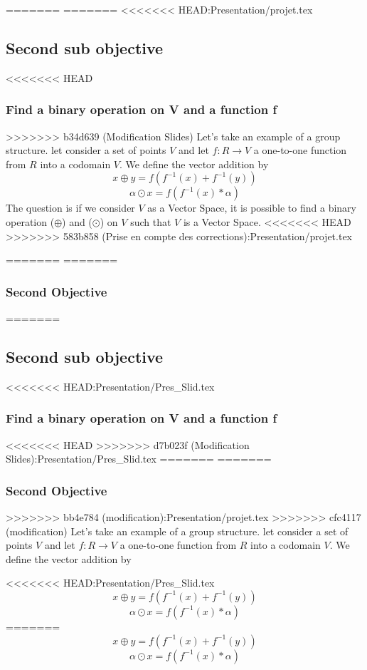 \documentclass{beamer}
\begin{document}
\begin{frame}
\begin{frame}
\begin{frame}
\begin{frame}
\begin{frame}
\begin{frame}
=======
=======
<<<<<<< HEAD:Presentation/projet.tex
\subsection{Second sub objective}
\begin{frame}
<<<<<<< HEAD
    \frametitle{Find a binary operation on V and a function f }
>>>>>>> b34d639 (Modification Slides)
    Let's take an example of a group structure.
    let consider a set of points  $ V $ and let  $ f: R \rightarrow V $ a one-to-one
    function from $R$ into a codomain $V$. We define the vector addition by
    $$ x \oplus y = f(f^{-1}(x) + f^{-1}(y)) $$
    $$ \alpha \odot x = f(f^{-1}(x) * \alpha) $$
    The question is if we consider $V$ as a Vector Space, it is possible to find a binary operation ($\oplus$) and ($\odot$) on $V$ such that $V$ is a Vector Space.
<<<<<<< HEAD
>>>>>>> 583b858 (Prise en compte des corrections):Presentation/projet.tex
\end{frame}
=======
=======
    \frametitle{Second Objective}
=======



\subsection{Second sub objective}
\begin{frame}
<<<<<<< HEAD:Presentation/Pres_Slid.tex
    \frametitle{Find a binary operation on V and a function f }
<<<<<<< HEAD
>>>>>>> d7b023f (Modification Slides):Presentation/Pres_Slid.tex
=======
=======
    \frametitle{Second Objective}
>>>>>>> bb4e784 (modification):Presentation/projet.tex
>>>>>>> cfc4117 (modification)
	Let's take an example of a group structure.
	let consider a set of points  $ V $ and let  $ f: R \rightarrow V $ a one-to-one
	function from $R$ into a codomain $V$. We define the vector addition by
	
<<<<<<< HEAD:Presentation/Pres_Slid.tex
    $$ x \oplus y = f(f^{-1}(x) + f^{-1}(y)) $$
    $$ \alpha \odot x = f(f^{-1}(x) * \alpha) $$
=======
     $$ x \oplus y = f(f^{-1}(x) + f^{-1}(y)) $$
     $$ \alpha \odot x = f(f^{-1}(x) * \alpha) $$
		

\end{frame}
\end{frame}
\end{frame}
\end{frame}
\end{frame}
\end{frame}
\end{frame}
\end{document}
